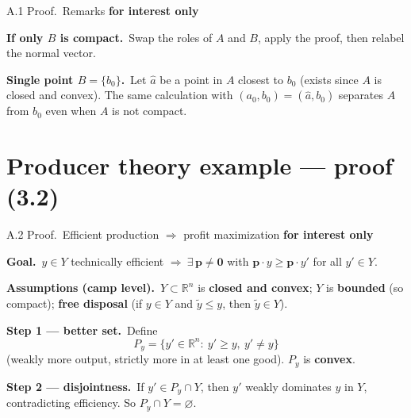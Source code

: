 \documentclass[11pt,aspectratio=169]{beamer}
\newcommand{\InterestOnly}{\textcolor{mAccent}{\textbf{for interest only}}}
\begin{document}
\begin{frame}{A.1 Proof.\ Remarks}
  \footnotesize
  \InterestOnly

  \medskip
  \textbf{If only $B$ is compact.}\
  Swap the roles of $A$ and $B$, apply the proof, then relabel the normal vector.

  \medskip
  \textbf{Single point $B=\{b_0\}$.}\
  Let $\hat a$ be a point in $A$ closest to $b_0$ (exists since $A$ is closed and convex).
  The same calculation with $(a_0,b_0)=(\hat a,b_0)$ separates $A$ from $b_0$ even when $A$ is not compact.
\end{frame}

\section{Producer theory example --- proof (3.2)}

\begin{frame}{A.2 Proof.\ Efficient production $\Rightarrow$ profit maximization}
  \hypertarget{sec:producer-proof}{}
  \footnotesize
  \InterestOnly

  \medskip
  \textbf{Goal.}\ $y\in Y$ technically efficient $\Rightarrow\ \exists\,\mathbf{p}\neq\mathbf{0}$ with
  $\mathbf{p}\cdot y\ge\mathbf{p}\cdot y'$ for all $y'\in Y$.

  \medskip
  \textbf{Assumptions (camp level).}\
  $Y\subset\mathbb{R}^n$ is \textbf{closed and convex}; $Y$ is \textbf{bounded} (so compact);
  \textbf{free disposal} (if $y\in Y$ and $\tilde y\le y$, then $\tilde y\in Y$).

  \medskip
  \textbf{Step 1 --- better set.}\
  Define
  \[
    P_y=\{y'\in\mathbb{R}^n:\ y'\ge y,\ y'\neq y\}
  \]
  (weakly more output, strictly more in at least one good). $P_y$ is \textbf{convex}.

  \medskip
  \textbf{Step 2 --- disjointness.}\
  If $y'\in P_y\cap Y$, then $y'$ weakly dominates $y$ in $Y$, contradicting efficiency.
  So $P_y\cap Y=\varnothing$.
\end{frame}
\end{document}
